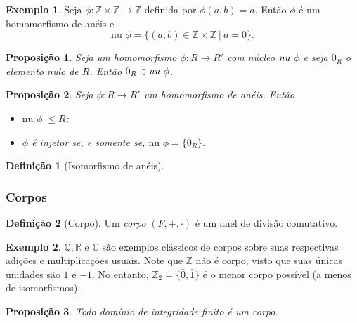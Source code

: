 \documentclass[a4paper,12pt]{report}
\theoremstyle{plain}
\newtheorem{proposicao}{Proposição}[section]
\theoremstyle{definition}
\newtheorem{definicao}{Definição}[section]
\newtheorem{exemplo}{Exemplo}[section]
\begin{document}
	\begin{exemplo}
		Seja $\phi: \mathbb{Z}\times \mathbb{Z} \longrightarrow \mathbb{Z}$ definida por $\phi(a,b) = a$. Então $\phi$ é um homomorfismo de anéis e
		$$\text{nu }\phi = \{(a,b) \in \mathbb{Z}\times \mathbb{Z} \ | \ a = 0\}.$$
	\end{exemplo}
	
	\begin{proposicao}
		Seja um homomorfismo $\phi:R\longrightarrow R'$ com núcleo $\text{\emph{nu} }\phi$ e seja $0_R$ o elemento nulo de $R$. Então $0_R \in \text{\emph{nu} }\phi$.
	\end{proposicao}
	
	\begin{proposicao}
		Seja $\phi: R \longrightarrow R'$ um homomorfismo de anéis. Então 
		\begin{itemize}
			\item $\text{nu } \phi\; \leq R$;
			\item $\phi$ é injetor se, e somente se, $\text{nu }\phi = \{0_R\}$.
		\end{itemize}
	\end{proposicao}
	
	\begin{definicao}[Isomorfismo de anéis]
		 
	\end{definicao}
	
	\subsubsection{Corpos}
	
	\begin{definicao}[Corpo]
		Um \textit{corpo} $(F, +, \cdot)$ é um anel de divisão comutativo.
	\end{definicao}
	
	\begin{exemplo}
		$\mathbb{Q}, \mathbb{R}$ e $\mathbb{C}$ são exemplos clássicos de corpos sobre suas respectivas adições e multiplicações usuais.
		Note que $\mathbb{Z}$ não é corpo, visto que suas únicas unidades são $1$ e $-1$. 
		No entanto, $\mathbb{Z}_2 = \{\bar 0,\bar 1\}$ é o menor corpo possível (a menos de isomorfismos).
	\end{exemplo}
	
	\begin{proposicao}
		Todo domínio de integridade finito é um corpo.
	\end{proposicao} %
	
\end{document}
